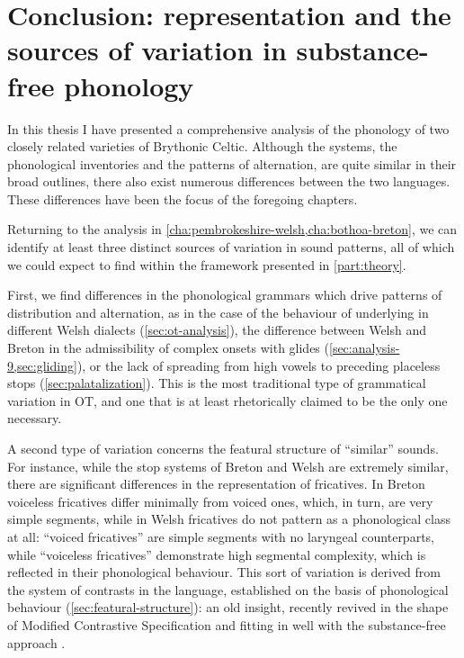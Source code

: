 \chapter[Representation and the sources of variation]{Conclusion: representation and the sources of variation in substance\hyp free phonology}
\label{cha:concl-repr-vari}

In this thesis I have presented a comprehensive analysis of the phonology of two closely related varieties of Brythonic Celtic. Although the systems, \ie the phonological inventories and the patterns of alternation, are quite similar in their broad outlines, there also exist numerous differences between the two languages. These differences have been the focus of the foregoing chapters.

Returning to the analysis in \cref{cha:pembrokeshire-welsh,cha:bothoa-breton}, we can identify at least three distinct sources of variation in sound patterns, all of which we could expect to find within the framework presented in \cref{part:theory}.

First, we find differences in the phonological grammars which drive patterns of distribution and alternation, as in the case of the behaviour of underlying \ipa{[ə]} in different Welsh dialects (\cref{sec:ot-analysis}), the difference between Welsh and Breton in the admissibility of complex onsets with glides (\cref{sec:analysis-9,sec:gliding}), or the lack of spreading from high vowels to preceding placeless stops (\cref{sec:palatalization}). This is the most traditional type of grammatical variation in OT, and one that is at least rhetorically claimed to be the only one necessary.

A second type of variation concerns the featural structure of \enquote{similar} sounds. For instance, while the stop systems of Breton and Welsh are extremely similar, there are significant differences in the representation of fricatives. In Breton voiceless fricatives differ minimally from voiced ones, which, in turn, are very simple segments, while in Welsh fricatives do not pattern as a phonological class at all: \enquote{voiced fricatives} are simple segments with no laryngeal counterparts, while \enquote{voiceless fricatives} demonstrate high segmental complexity, which is reflected in their phonological behaviour. This sort of variation is derived from the system of contrasts in the language, established on the basis of phonological behaviour (\cref{sec:featural-structure}): an old insight, recently revived in the shape of Modified Contrastive Specification \citep{torontoschool,dresher09,currie07} and fitting in well with the substance\hyp free approach \citep{moren-serbian,moren-foa,blaho-diss}.

